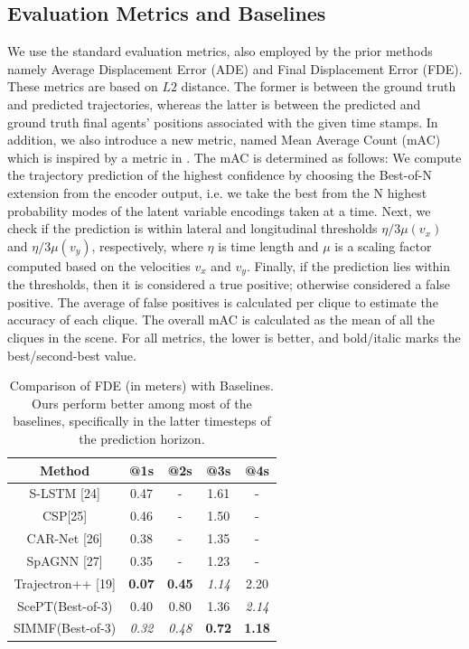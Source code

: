 \documentclass[letterpaper, 10 pt, conference]{ieeeconf}  %
\begin{document}
\subsection{Evaluation Metrics and Baselines} 
We use the standard evaluation metrics, also employed by the prior methods \cite{chen2022scept, salzmann2021trajectron, agentformer, laformer} namely Average Displacement Error (ADE) and Final Displacement Error (FDE). These metrics are based on $L2$ distance. The former is between the ground truth and predicted trajectories, whereas the latter is between the predicted and ground truth final agents' positions associated with the given time stamps. In addition, we also introduce a new metric, named Mean Average Count (mAC) which is inspired by a metric in \cite{waymo}. The mAC is determined as follows: We compute the trajectory prediction of the highest confidence by choosing the Best-of-N extension from the encoder output, i.e. we take the best from the N highest probability modes of the latent variable encodings taken at a time. Next, we check if the prediction is within lateral and longitudinal thresholds $\eta/3\mu(v_x)$ and $\eta/3\mu(v_y)$, respectively, where $\eta$ is time length and $\mu$ is a scaling factor computed based on the velocities $v_x$ and $v_y$. Finally, if the prediction lies within the thresholds, then it is considered a true positive; otherwise considered a false positive. The average of false positives is calculated per clique to estimate the accuracy of each clique. The overall mAC is calculated as the mean of all the cliques in the scene. For all metrics, the lower is better, and bold/italic marks the best/second-best value.
\begin{table}[h]
\begin{center}
\begin{tabular}{ccccc}
\toprule
Method  &@1s & @2s & @3s & @4s  \\
\midrule
S-LSTM [24]& 0.47 & - & 1.61 & - \\
CSP[25]      & 0.46 & - & 1.50 & - \\
CAR-Net [26] & 0.38 & - & 1.35 & - \\
SpAGNN [27] & 0.35 & -& 1.23 & - \\
Trajectron++ [19] & \textbf{0.07} & \textbf{0.45} & \textit{1.14 }& 2.20 \\
ScePT(Best-of-3) & 0.40 & 0.80 & 1.36 &\textit{ 2.14} \\
\midrule
SIMMF(Best-of-3) & \textit{0.32 }& \textit{0.48} & \textbf{0.72}
 & \textbf{1.18 }\\
\bottomrule
\end{tabular}
\end{center}\vspace{-0,1in}
\caption{Comparison of FDE (in meters) with Baselines. Ours perform better among most of the baselines, specifically in the latter timesteps of the prediction horizon.}\label{fde}  \vspace{-.2in}
\end{table}
\end{document}
